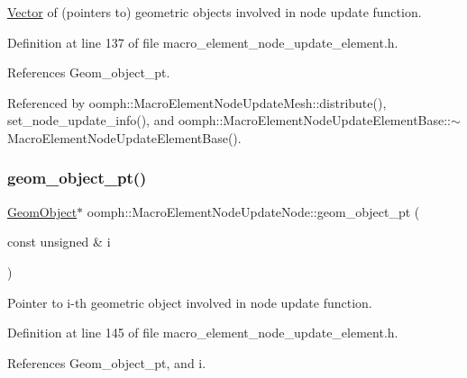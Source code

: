 \hyperlink{classoomph_1_1Vector}{Vector} of (pointers to) geometric objects involved in node update function. 



Definition at line 137 of file macro\+\_\+element\+\_\+node\+\_\+update\+\_\+element.\+h.



References Geom\+\_\+object\+\_\+pt.



Referenced by oomph\+::\+Macro\+Element\+Node\+Update\+Mesh\+::distribute(), set\+\_\+node\+\_\+update\+\_\+info(), and oomph\+::\+Macro\+Element\+Node\+Update\+Element\+Base\+::$\sim$\+Macro\+Element\+Node\+Update\+Element\+Base().

\mbox{\label{classoomph_1_1MacroElementNodeUpdateNode_a80abfe86ba00017a2c704ce354aaa4d2}} 
\subsubsection{\texorpdfstring{geom\+\_\+object\+\_\+pt()}{geom\_object\_pt()}\hspace{0.1cm}{\footnotesize\ttfamily [2/2]}}
{\footnotesize\ttfamily \hyperlink{classoomph_1_1GeomObject}{Geom\+Object}$\ast$ oomph\+::\+Macro\+Element\+Node\+Update\+Node\+::geom\+\_\+object\+\_\+pt (\begin{DoxyParamCaption}\item[{const unsigned \&}]{i }\end{DoxyParamCaption})\hspace{0.3cm}{\ttfamily [inline]}}



Pointer to i-\/th geometric object involved in node update function. 



Definition at line 145 of file macro\+\_\+element\+\_\+node\+\_\+update\+\_\+element.\+h.



References Geom\+\_\+object\+\_\+pt, and i.

\mbox{\label{classoomph_1_1MacroElementNodeUpdateNode_abf17a352b005d110874c1f4fe715faeb}} 
